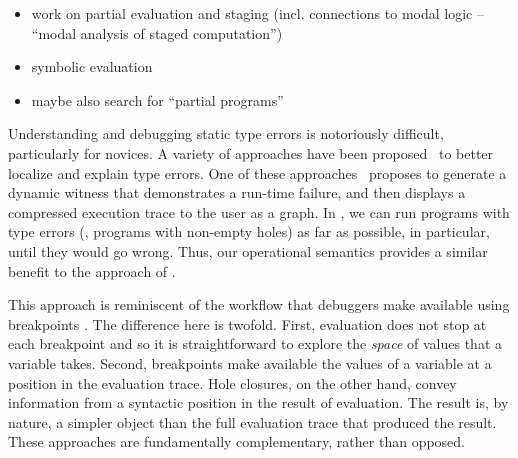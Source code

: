 
\begin{itemize}
	\item work on partial evaluation and staging (incl. connections to modal logic -- ``modal analysis of staged computation'')
	\item symbolic evaluation
	\item maybe also search for ``partial programs'' 
\end{itemize}

Understanding and debugging static type errors is notoriously difficult,
particularly for novices.
%
A variety of approaches have been
proposed~\cite{Seminal,ChenErwig2014,Pavlinovic2015,sherrloc} to better localize
and explain type errors.
%
One of these approaches~\cite{Seidel2016} proposes to generate a dynamic witness
that demonstrates a run-time failure, and then displays a compressed execution
trace to the user as a graph.
%
In \HazelnutLive{}, we can run programs with type errors (\ie{}, programs with
non-empty holes) as far as possible, in particular, until they
would go wrong.
%
Thus, our operational semantics provides a similar benefit to the approach of
\citet{Seidel2016}.

This approach is reminiscent of the workflow that debuggers make available using breakpoints \cite{fitzgerald2008debugging,DBLP:journals/jfp/TolmachA95}. 
The difference here is twofold. First, evaluation does not stop at each breakpoint and so it is straightforward to explore the \emph{space} of values that a variable takes. Second, breakpoints make available the values of a variable at a position in the evaluation trace. Hole closures, on the other hand, convey information from a syntactic position in the result of evaluation. The result is, by nature, a simpler object than the full evaluation trace that produced the result. These approaches are fundamentally complementary, rather than opposed.

